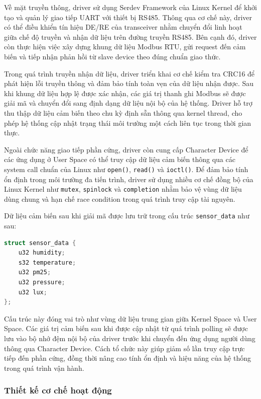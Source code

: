 Về mặt truyền thông, driver sử dụng Serdev Framework của Linux Kernel để khởi tạo và quản lý giao tiếp UART với thiết bị RS485. Thông qua cơ chế này, driver có thể điều khiển tín hiệu DE/RE của transceiver nhằm chuyển đổi linh hoạt giữa chế độ truyền và nhận dữ liệu trên đường truyền RS485. Bên cạnh đó, driver còn thực hiện việc xây dựng khung dữ liệu Modbus RTU, gửi request đến cảm biến và tiếp nhận phản hồi từ slave device theo đúng chuẩn giao thức.

Trong quá trình truyền nhận dữ liệu, driver triển khai cơ chế kiểm tra CRC16 để phát hiện lỗi truyền thông và đảm bảo tính toàn vẹn của dữ liệu nhận được. Sau khi khung dữ liệu hợp lệ được xác nhận, các giá trị thanh ghi Modbus sẽ được giải mã và chuyển đổi sang định dạng dữ liệu nội bộ của hệ thống. Driver hỗ trợ thu thập dữ liệu cảm biến theo chu kỳ định sẵn thông qua kernel thread, cho phép hệ thống cập nhật trạng thái môi trường một cách liên tục trong thời gian thực.

Ngoài chức năng giao tiếp phần cứng, driver còn cung cấp Character Device để các ứng dụng ở User Space có thể truy cập dữ liệu cảm biến thông qua các system call chuẩn của Linux như \texttt{open()}, \texttt{read()} và \texttt{ioctl()}. Để đảm bảo tính ổn định trong môi trường đa tiến trình, driver sử dụng nhiều cơ chế đồng bộ của Linux Kernel như \texttt{mutex}, \texttt{spinlock} và \texttt{completion} nhằm bảo vệ vùng dữ liệu dùng chung và hạn chế race condition trong quá trình truy cập tài nguyên.

Dữ liệu cảm biến sau khi giải mã được lưu trữ trong cấu trúc \texttt{sensor\_data} như sau:

\begin{lstlisting}[style=thesisstyle, language=C]
struct sensor_data {
    u32 humidity;
    s32 temperature;
    u32 pm25;
    u32 pressure;
    u32 lux;
};
\end{lstlisting}

Cấu trúc này đóng vai trò như vùng dữ liệu trung gian giữa Kernel Space và User Space. Các giá trị cảm biến sau khi được cập nhật từ quá trình polling sẽ được lưu vào bộ nhớ đệm nội bộ của driver trước khi chuyển đến ứng dụng người dùng thông qua Character Device. Cách tổ chức này giúp giảm số lần truy cập trực tiếp đến phần cứng, đồng thời nâng cao tính ổn định và hiệu năng của hệ thống trong quá trình vận hành.
\subsubsection{Thiết kế cơ chế hoạt động}

